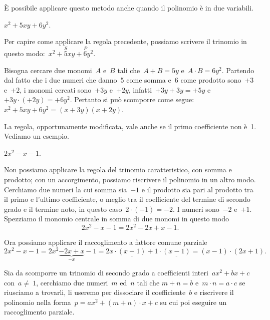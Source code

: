 
È possibile applicare questo metodo anche quando il
polinomio è in due variabili.

 \begin{esempio}
 \(x^{2}+5xy+6y^{2}\).

 Per capire come applicare la regola precedente, possiamo scrivere il
trinomio in questo modo:~\(x^{2}+\overset{S}{5}xy+\overset{P}{6}y{^{2}}\).

Bisogna cercare due monomi~\(A\) e~\(B\) tali che~\(A+B=5y\)
e~\(A\cdot B=6y^{2}\). Partendo dal fatto che i due numeri che danno~5
come somma e~6 come prodotto sono~\(+3\) e~\(+2\), i monomi cercati 
sono~\(+3y\) e~\(+2y\), infatti~\(+3y+3y=+5y\) e~\(+3y\cdot (+2y)=+6y^{2}\). 
Pertanto si può scomporre come segue:~\(x^{2}+5xy+6y^{2}=(x+3y)(x+2y)\).
 \end{esempio}

La regola, opportunamente modificata, vale anche se il primo
coefficiente non è~1. Vediamo un esempio.

 \begin{esempio}
 \(2x^{2}-x-1\).

Non possiamo applicare la regola del trinomio caratteristico, con somma
e prodotto; con un accorgimento, possiamo riscrivere il polinomio in un
altro modo. Cerchiamo due numeri la cui somma sia~\(-1\) e il prodotto sia
pari al prodotto tra il primo e l'ultimo coefficiente,
o meglio tra il coefficiente del termine di secondo grado e il termine
noto, in questo caso~\(2\cdot (-1)=-2\). I numeri sono~\(-2\) e~\(+1\).
Spezziamo il monomio centrale in somma di due monomi in questo modo
\[2x^{2}-x-1=2x^{2}-2x+x-1.\]

Ora possiamo applicare il raccoglimento a fattore comune parziale
\[2x^{2}-x-1=2x^{2}\underbrace{-2x+x}_{-x}-1=2x\cdot
\underline{{(x-1)}}+1\cdot
\underline{{(x-1)}}=\left(x-1\right)\cdot \left(2x+1\right).\]
 \end{esempio}

\begin{procedura}
Sia da scomporre un trinomio di secondo grado a coefficienti 
interi~\(ax^{2}+bx+c\)
con~\(a\neq~1\), cerchiamo due numeri~\(m\) ed~\(n\) tali che  \(m+n=b\) e~\(m\cdot 
n=a\cdot c\)
se riusciamo a trovarli, li useremo per dissociare
il coefficiente~\(b\) e riscrivere il polinomio nella 
forma~\(p=ax^{2}+\left(m+n\right)\cdot x+c\)
su cui poi eseguire un raccoglimento parziale.
\end{procedura}

